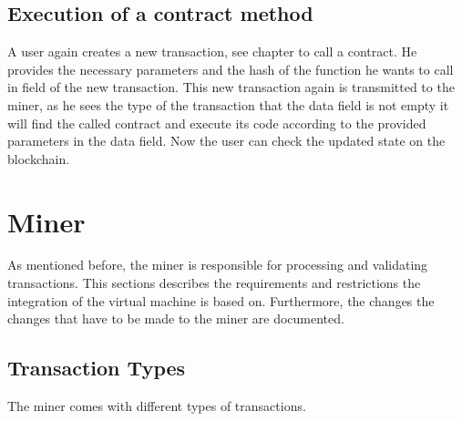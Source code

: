 \subsection{Execution of a contract method}
A user again creates a new transaction, see chapter to call a contract. He provides the necessary parameters and the hash of the function he wants to call in field of the new transaction. This new transaction again is transmitted to the miner, as he sees the type of the transaction that the data field is not empty it will find the called contract and execute its code according to the provided parameters in the data field. Now the user can check the updated state on the blockchain. 
\pagebreak

\section{Miner}
As mentioned before, the miner is responsible for processing and validating transactions. This sections describes the requirements and restrictions the integration of the virtual machine is based on. Furthermore, the changes the changes that have to be made to the miner are documented.

\subsection{Transaction Types} \label{transactionTypes}
The miner comes with different types of transactions. 

